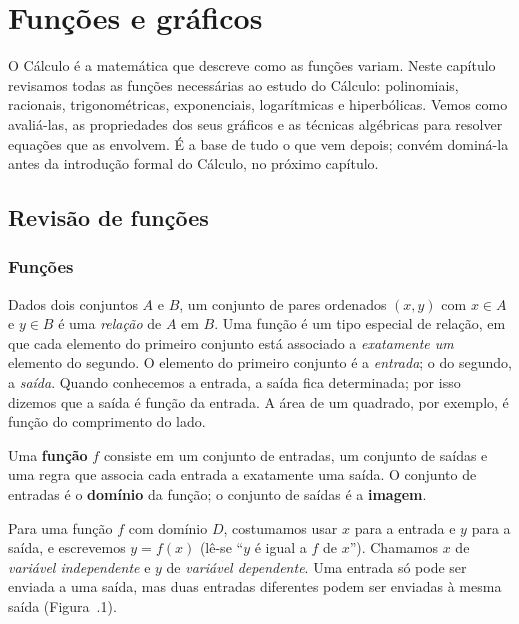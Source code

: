 \chapter{Funções e gráficos}

O Cálculo é a matemática que descreve como as funções variam. Neste capítulo revisamos
todas as funções necessárias ao estudo do Cálculo: polinomiais, racionais, trigonométricas,
exponenciais, logarítmicas e hiperbólicas. Vemos como avaliá-las, as propriedades dos seus
gráficos e as técnicas algébricas para resolver equações que as envolvem. É a base de tudo o
que vem depois; convém dominá-la antes da introdução formal do Cálculo, no próximo capítulo.

\section{Revisão de funções}

\subsection{Funções}

Dados dois conjuntos $A$ e $B$, um conjunto de pares ordenados $(x,y)$ com $x\in A$ e
$y\in B$ é uma \emph{relação} de $A$ em $B$. Uma função é um tipo especial de relação, em
que cada elemento do primeiro conjunto está associado a \emph{exatamente um} elemento do
segundo. O elemento do primeiro conjunto é a \emph{entrada}; o do segundo, a \emph{saída}.
Quando conhecemos a entrada, a saída fica determinada; por isso dizemos que a saída é
função da entrada. A área de um quadrado, por exemplo, é função do comprimento do lado.

\begin{definicao}
Uma \textbf{função} $f$ consiste em um conjunto de entradas, um conjunto de saídas e uma
regra que associa cada entrada a exatamente uma saída. O conjunto de entradas é o
\textbf{domínio} da função; o conjunto de saídas é a \textbf{imagem}.
\end{definicao}

Para uma função $f$ com domínio $D$, costumamos usar $x$ para a entrada e $y$ para a saída,
e escrevemos $y=f(x)$ (lê-se ``$y$ é igual a $f$ de $x$''). Chamamos $x$ de \emph{variável
independente} e $y$ de \emph{variável dependente}. Uma entrada só pode ser enviada a uma
saída, mas duas entradas diferentes podem ser enviadas à mesma saída
(Figura~\thechapter.1).

